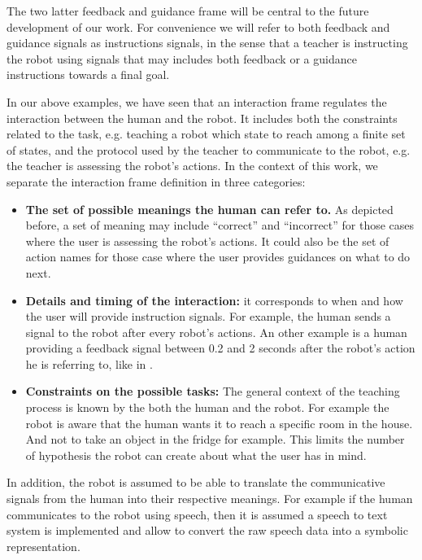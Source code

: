 The two latter feedback and guidance frame will be central to the future development of our work. For convenience we will refer to both feedback and guidance signals as instructions signals, in the sense that a teacher is instructing the robot using signals that may includes both feedback or a guidance instructions towards a final goal.

In our above examples, we have seen that an interaction frame regulates the interaction between the human and the robot. It includes both the constraints related to the task, e.g. teaching a robot which state to reach among a finite set of states, and the protocol used by the teacher to communicate to the robot, e.g. the teacher is assessing the robot's actions. In the context of this work, we separate the interaction frame definition in three categories:

\begin{itemize}

\item \textbf{The set of possible meanings the human can refer to.} As depicted before, a set of meaning may include ``correct'' and ``incorrect'' for those cases where the user is assessing the robot's actions. It could also be the set of action names for those case where the user provides guidances on what to do next.

\item \textbf{Details and timing of the interaction:} it corresponds to when and how the user will provide instruction signals. For example, the human sends a signal to the robot after every robot's actions. An other example is a human providing a feedback signal between 0.2 and 2 seconds after the robot's action he is referring to, like in \cite{knox2009interactively}.

\item \textbf{Constraints on the possible tasks:} The general context of the teaching process is known by the both the human and the robot. For example the robot is aware that the human wants it to reach a specific room in the house. And not to take an object in the fridge for example. This limits the number of hypothesis the robot can create about what the user has in mind.

\end{itemize}

In addition, the robot is assumed to be able to translate the communicative signals from the human into their respective meanings. For example if the human communicates to the robot using speech, then it is assumed a speech to text system is implemented and allow to convert the raw speech data into a symbolic representation.

